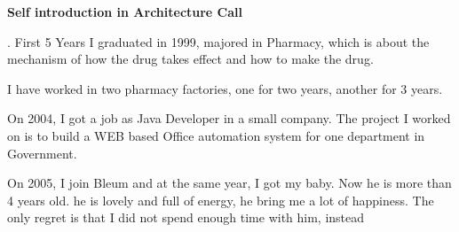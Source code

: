 
\hsize=29pc
\vsize=42pc
\topglue 0.5in

\centerline{\bf Self introduction in Architecture Call}

. First 5 Years
I graduated in 1999, majored in Pharmacy, which is about the mechanism of how the
drug takes effect and how to make the drug. 

I have worked in two pharmacy factories, one for two years, another for 3 years.

On 2004, I got a job as Java Developer in a small company. The project I worked on
is to build a WEB based Office automation system for one department in Government.

On 2005, I join Bleum and at the same year, I got my baby. Now he is more than 4 years old.
he is lovely and full of energy, he bring me a lot of happiness. The only regret is that 
I did not spend enough time with him, instead 




 \bye
